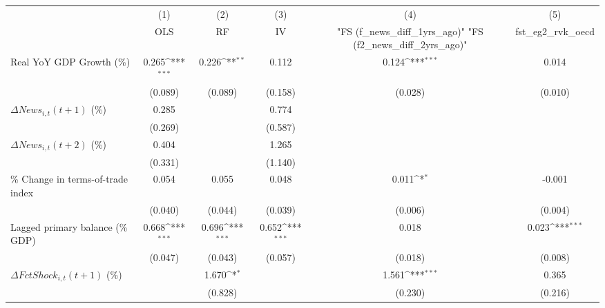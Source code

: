 {
\def\sym#1{\ifmmode^{#1}\else\(^{#1}\)\fi}
\begin{tabular}{l*{5}{c}}
\toprule
                    &\multicolumn{1}{c}{(1)}&\multicolumn{1}{c}{(2)}&\multicolumn{1}{c}{(3)}&\multicolumn{1}{c}{(4)}&\multicolumn{1}{c}{(5)}\\
                    &\multicolumn{1}{c}{OLS}&\multicolumn{1}{c}{RF}&\multicolumn{1}{c}{IV}&\multicolumn{1}{c}{ "FS (f_news_diff_1yrs_ago)"  "FS (f2_news_diff_2yrs_ago)" }&\multicolumn{1}{c}{fst_eg2_rvk_oecd}\\
\midrule
Real YoY GDP Growth (\%)&       0.265\sym{***}&       0.226\sym{**} &       0.112         &       0.124\sym{***}&       0.014         \\
                    &     (0.089)         &     (0.089)         &     (0.158)         &     (0.028)         &     (0.010)         \\
\addlinespace
$ \Delta News_{i,t}(t+1)$ (\%)&       0.285         &                     &       0.774         &                     &                     \\
                    &     (0.269)         &                     &     (0.587)         &                     &                     \\
\addlinespace
$ \Delta News_{i,t}(t+2)$ (\%)&       0.404         &                     &       1.265         &                     &                     \\
                    &     (0.331)         &                     &     (1.140)         &                     &                     \\
\addlinespace
\% Change in terms-of-trade index&       0.054         &       0.055         &       0.048         &       0.011\sym{*}  &      -0.001         \\
                    &     (0.040)         &     (0.044)         &     (0.039)         &     (0.006)         &     (0.004)         \\
\addlinespace
Lagged primary balance (\% GDP)&       0.668\sym{***}&       0.696\sym{***}&       0.652\sym{***}&       0.018         &       0.023\sym{***}\\
                    &     (0.047)         &     (0.043)         &     (0.057)         &     (0.018)         &     (0.008)         \\
\addlinespace
$ \Delta FctShock_{i,t}(t+1)$ (\%)&                     &       1.670\sym{*}  &                     &       1.561\sym{***}&       0.365         \\
                    &                     &     (0.828)         &                     &     (0.230)         &     (0.216)         \\

\end{tabular}}
